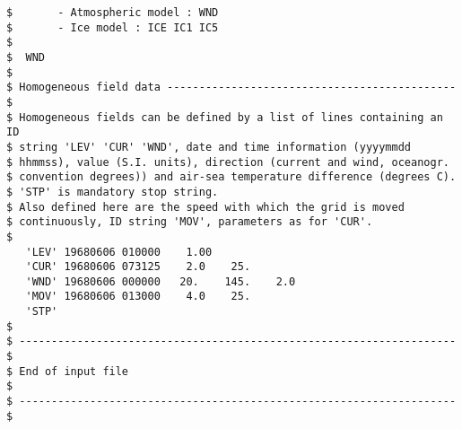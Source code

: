 \begin{footnotesize}
\begin{verbatim}
$       - Atmospheric model : WND
$       - Ice model : ICE IC1 IC5
$
$  WND
$
$ Homogeneous field data --------------------------------------------- $
$ Homogeneous fields can be defined by a list of lines containing an ID
$ string 'LEV' 'CUR' 'WND', date and time information (yyyymmdd
$ hhmmss), value (S.I. units), direction (current and wind, oceanogr.
$ convention degrees)) and air-sea temperature difference (degrees C).
$ 'STP' is mandatory stop string.
$ Also defined here are the speed with which the grid is moved
$ continuously, ID string 'MOV', parameters as for 'CUR'.
$
   'LEV' 19680606 010000    1.00
   'CUR' 19680606 073125    2.0    25.
   'WND' 19680606 000000   20.    145.    2.0
   'MOV' 19680606 013000    4.0    25.
   'STP'
$
$ -------------------------------------------------------------------- $
$ End of input file                                                    $
$ -------------------------------------------------------------------- $
\end{verbatim}
\end{footnotesize}
